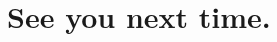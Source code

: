 \documentclass[aspectratio=169,xcolor={dvipsnames,table}]{beamer}
\begin{document}
\section*{See you next time.}
\end{document}

